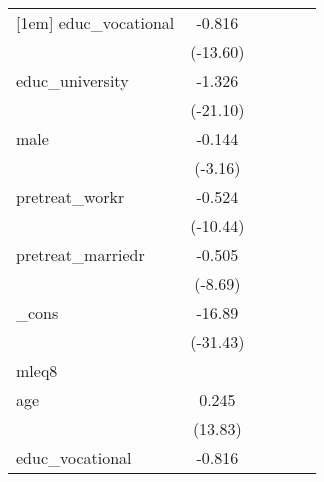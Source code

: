 {\begin{tabular}{l*{5}{c}}
[1em]
educ\_vocational&      -0.816\sym{***}&                     &                     &                     &                     \\
            &    (-13.60)         &                     &                     &                     &                     \\
[1em]
educ\_university&      -1.326\sym{***}&                     &                     &                     &                     \\
            &    (-21.10)         &                     &                     &                     &                     \\
[1em]
male        &      -0.144\sym{**} &                     &                     &                     &                     \\
            &     (-3.16)         &                     &                     &                     &                     \\
[1em]
pretreat\_workr&      -0.524\sym{***}&                     &                     &                     &                     \\
            &    (-10.44)         &                     &                     &                     &                     \\
[1em]
pretreat\_marriedr&      -0.505\sym{***}&                     &                     &                     &                     \\
            &     (-8.69)         &                     &                     &                     &                     \\
[1em]
\_cons      &      -16.89\sym{***}&                     &                     &                     &                     \\
            &    (-31.43)         &                     &                     &                     &                     \\
\hline
mleq8       &                     &                     &                     &                     &                     \\
age         &       0.245\sym{***}&                     &                     &                     &                     \\
            &     (13.83)         &                     &                     &                     &                     \\
[1em]
educ\_vocational&      -0.816\sym{***}&                     &                     &                     &                     \\

\end{tabular}}
